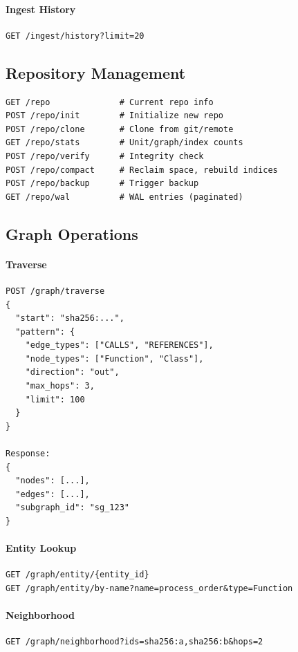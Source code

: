 \paragraph{Ingest History}
\begin{verbatim}
GET /ingest/history?limit=20
\end{verbatim}

\subsection{Repository Management}
\label{sec:api:repo}

\begin{verbatim}
GET /repo              # Current repo info
POST /repo/init        # Initialize new repo
POST /repo/clone       # Clone from git/remote
GET /repo/stats        # Unit/graph/index counts
POST /repo/verify      # Integrity check
POST /repo/compact     # Reclaim space, rebuild indices
POST /repo/backup      # Trigger backup
GET /repo/wal          # WAL entries (paginated)
\end{verbatim}

\subsection{Graph Operations}
\label{sec:api:graph}

\paragraph{Traverse}
\begin{verbatim}
POST /graph/traverse
{
  "start": "sha256:...",
  "pattern": {
    "edge_types": ["CALLS", "REFERENCES"],
    "node_types": ["Function", "Class"],
    "direction": "out",
    "max_hops": 3,
    "limit": 100
  }
}

Response:
{
  "nodes": [...],
  "edges": [...],
  "subgraph_id": "sg_123"
}
\end{verbatim}

\paragraph{Entity Lookup}
\begin{verbatim}
GET /graph/entity/{entity_id}
GET /graph/entity/by-name?name=process_order&type=Function
\end{verbatim}

\paragraph{Neighborhood}
\begin{verbatim}
GET /graph/neighborhood?ids=sha256:a,sha256:b&hops=2
\end{verbatim}

